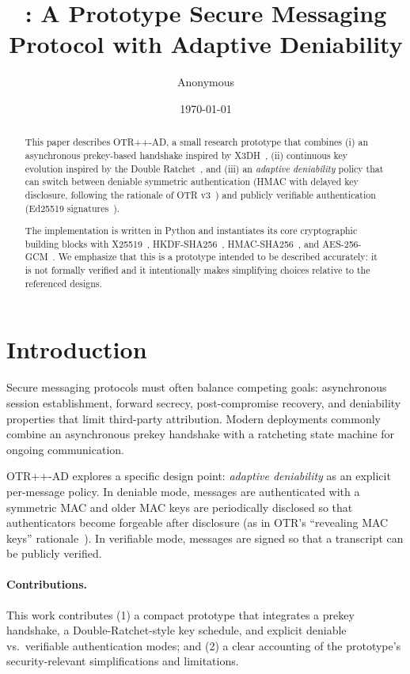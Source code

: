 \documentclass[11pt]{article}
\title{\prot: A Prototype Secure Messaging Protocol with Adaptive Deniability}
\author{Anonymous}
\date{\today}
\newcommand{\prot}{OTR++-AD}
\begin{document}
\maketitle

\begin{abstract}
This paper describes \prot{}, a small research prototype that combines (i) an asynchronous prekey-based handshake inspired by X3DH~\cite{signal_x3dh}, (ii) continuous key evolution inspired by the Double Ratchet~\cite{signal_doubleratchet}, and (iii) an \emph{adaptive deniability} policy that can switch between deniable symmetric authentication (HMAC with delayed key disclosure, following the rationale of OTR v3~\cite{otr_v3}) and publicly verifiable authentication (Ed25519 signatures~\cite{rfc8032}).

The implementation is written in Python and instantiates its core cryptographic building blocks with X25519~\cite{rfc7748}, HKDF-SHA256~\cite{rfc5869}, HMAC-SHA256~\cite{rfc2104}, and AES-256-GCM~\cite{nist_fips197,nist_sp800_38d}. We emphasize that this is a prototype intended to be described accurately: it is not formally verified and it intentionally makes simplifying choices relative to the referenced designs.
\end{abstract}

\section{Introduction}
Secure messaging protocols must often balance competing goals: asynchronous session establishment, forward secrecy, post-compromise recovery, and deniability properties that limit third-party attribution.
Modern deployments commonly combine an asynchronous prekey handshake with a ratcheting state machine for ongoing communication.

\prot{} explores a specific design point: \emph{adaptive deniability} as an explicit per-message policy.
In deniable mode, messages are authenticated with a symmetric MAC and older MAC keys are periodically disclosed so that authenticators become forgeable after disclosure (as in OTR's ``revealing MAC keys'' rationale~\cite{otr_v3}).
In verifiable mode, messages are signed so that a transcript can be publicly verified.

\paragraph{Contributions.}
This work contributes (1) a compact prototype that integrates a prekey handshake, a Double-Ratchet-style key schedule, and explicit deniable vs.~verifiable authentication modes; and (2) a clear accounting of the prototype's security-relevant simplifications and limitations.
\end{document}
